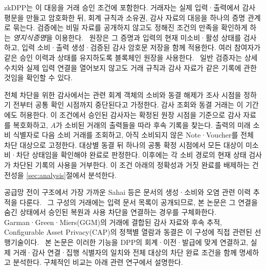 zkDPP는 이 대응을 거래 승인 조건에 포함한다.
거래자는 실제 입력·출력에서 감사 평문을 만들고 암호화한 뒤,
회계 규칙과 소유권, 감사 자료의 대응을 하나의 증명 관계로 묶는다.
검증에는 비밀 자료를 공개하지 않고도 정해진 조건의 만족을 확인하게
하는 \emph{영지식증명}을 이용한다.~\cite[20.3.5절]{boneh-shoup-2020}
원장은 그 증명과 입력의 현재 미소비·활성 상태를 검사하고,
입력 소비·출력 생성·검증된 감사 암호문 저장을 함께 적용한다.
여러 참여자가 같은 승인 이력과 상태를 유지하도록 블록체인 원장을
사용한다.~\cite{nist-blockchain-2018}
일반 검증자는 상세 수치와 실제 입력 연결을 열어보지 않고도
거래 규칙과 감사 자료가 같은 기록에 관한 것임을 확인할 수 있다.

전체 차단을 위한 감사에서는 관련 회계 객체의 소비와 동결 해제가
조사 시점을 정하기 전부터 공통 확인 시점까지 중단된다고 가정한다.
감사 조회와 동결 거래는 이 기간에도 허용한다.
이 조건에서 승인된 감사자는 확정된 원장 시점을 기준으로
감사 자료를 복호화하고, $A$가 소비된 거래의 출력들을 따라
후속 기록을 찾는다. 출력의 미래 소비 식별자로 다음 소비 거래를
조회하고, 아직 소비되지 않은 Note·Voucher를 전체 차단 대상으로
고정한다.
대상별 동결 뒤 하나의 공통 확정 시점에서 모든 대상이 미소비·차단
상태임을 확인해야 완료로 판정한다. 이후에는 각 소비 경로의 현재
상태 검사가 차단된 기록의 사용을 거부한다.
이 조건 아래의 정확성과 거짓 완료를 배제하는 건전성을
\ref{sec:analysis}절에서 분석한다.

공급망 전이 구조에서 가장 가까운 Sahai 등은 문서의 생성·소비와
오염 관련 이력 추적을 다룬다.~\cite{sahai-supply-chain-2020}
그 구성의 거래에는 입력 문서 목록이 공개되므로,
본 논문은 그 연결을 숨긴 상태에서 승인된 복원과 사용 차단을
연결하는 경우를 구체화한다.~\cite[IV절]{sahai-supply-chain-2020}
Garman·Green·Miers(GGM)의 거래에 결합된 감사 자료와 후속 추적,
Configurable Asset Privacy(CAP)의 정책별 열람과 동결은 이 구성에
직접 관련된 선행기술이다.~\cite[4.5·5절]{garman-accountable-privacy-2017}\cite[2.2·3.2.4절]{espresso-cap-spec-2022}
본 논문은 이러한 기능을 DPP의 회계·이전·발급에 맞게 연결하고,
실제 거래·감사 연결·집행 식별자의 일치와 전체 대상의 차단 완료
조건을 함께 명세하고 분석한다. 구체적인 비교는 아래 관련 연구에서
설명한다.

